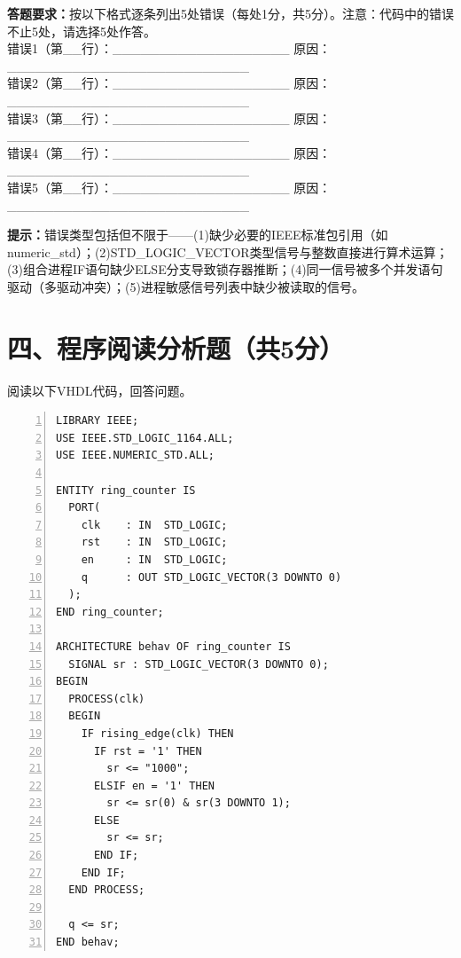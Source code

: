 \begin{framed}
\textbf{答题要求：}按以下格式逐条列出5处错误（每处1分，共5分）。注意：代码中的错误不止5处，请选择5处作答。\\[4pt]
错误1（第\_\_行）：\_\_\_\_\_\_\_\_\_\_\_\_\_\_\_\_\_\_\_ 原因：\_\_\_\_\_\_\_\_\_\_\_\_\_\_\_\_\_\_\_\_\_\_\_\_\_\_\\[2pt]
错误2（第\_\_行）：\_\_\_\_\_\_\_\_\_\_\_\_\_\_\_\_\_\_\_ 原因：\_\_\_\_\_\_\_\_\_\_\_\_\_\_\_\_\_\_\_\_\_\_\_\_\_\_\\[2pt]
错误3（第\_\_行）：\_\_\_\_\_\_\_\_\_\_\_\_\_\_\_\_\_\_\_ 原因：\_\_\_\_\_\_\_\_\_\_\_\_\_\_\_\_\_\_\_\_\_\_\_\_\_\_\\[2pt]
错误4（第\_\_行）：\_\_\_\_\_\_\_\_\_\_\_\_\_\_\_\_\_\_\_ 原因：\_\_\_\_\_\_\_\_\_\_\_\_\_\_\_\_\_\_\_\_\_\_\_\_\_\_\\[2pt]
错误5（第\_\_行）：\_\_\_\_\_\_\_\_\_\_\_\_\_\_\_\_\_\_\_ 原因：\_\_\_\_\_\_\_\_\_\_\_\_\_\_\_\_\_\_\_\_\_\_\_\_\_\_

\vspace{0.5cm}
\textbf{提示：}错误类型包括但不限于——(1)缺少必要的IEEE标准包引用（如numeric\_std）；(2)STD\_LOGIC\_VECTOR类型信号与整数直接进行算术运算；(3)组合进程IF语句缺少ELSE分支导致锁存器推断；(4)同一信号被多个并发语句驱动（多驱动冲突）；(5)进程敏感信号列表中缺少被读取的信号。
\end{framed}

\newpage

\section*{四、程序阅读分析题（共5分）}

阅读以下VHDL代码，回答问题。

\vspace{0.3cm}

\begin{lstlisting}[caption={环形计数器/序列发生器——待分析VHDL程序}, language=VDL, numbers=left]
LIBRARY IEEE;
USE IEEE.STD_LOGIC_1164.ALL;
USE IEEE.NUMERIC_STD.ALL;

ENTITY ring_counter IS
  PORT(
    clk    : IN  STD_LOGIC;
    rst    : IN  STD_LOGIC;
    en     : IN  STD_LOGIC;
    q      : OUT STD_LOGIC_VECTOR(3 DOWNTO 0)
  );
END ring_counter;

ARCHITECTURE behav OF ring_counter IS
  SIGNAL sr : STD_LOGIC_VECTOR(3 DOWNTO 0);
BEGIN
  PROCESS(clk)
  BEGIN
    IF rising_edge(clk) THEN
      IF rst = '1' THEN
        sr <= "1000";
      ELSIF en = '1' THEN
        sr <= sr(0) & sr(3 DOWNTO 1);
      ELSE
        sr <= sr;
      END IF;
    END IF;
  END PROCESS;

  q <= sr;
END behav;
\end{lstlisting}

